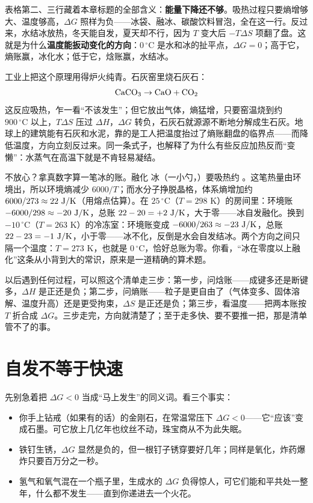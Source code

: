 表格第二、三行藏着本章标题的全部含义：\textbf{能量下降还不够}。吸热过程只要熵增够大、温度够高，$\Delta G$ 照样为负——冰袋、融冰、碳酸饮料冒泡，全在这一行。反过来，水结冰放热，冬天能自发，夏天却不行，因为 $T$ 变大后 $-T\Delta S$ 项翻了盘。这就是为什么\textbf{温度能扳动变化的方向}：$0\,^{\circ}\mathrm{C}$ 是水和冰的扯平点，$\Delta G=0$；高于它，熵账赢，冰化水；低于它，焓账赢，水结冰。

工业上把这个原理用得炉火纯青。石灰窑里烧石灰石：\[\mathrm{CaCO_3} \rightarrow \mathrm{CaO} + \mathrm{CO_2}\] 这反应吸热，乍一看“不该发生”；但它放出气体，熵猛增，只要窑温烧到约 $900\,^{\circ}\mathrm{C}$ 以上，$T\Delta S$ 压过 $\Delta H$，$\Delta G$ 转负，石灰石就源源不断地分解成生石灰。地球上的建筑能有石灰和水泥，靠的是工人把温度抬过了熵账翻盘的临界点——而降低温度，方向立刻反过来。同一条式子，也解释了为什么有些反应加热反而“变懒”：水蒸气在高温下就是不肯轻易凝结。

不放心？拿真数字算一笔冰的账。融化  冰（一小勺，）要吸热约 。这笔热量由环境出，所以环境熵减少 $6000/T$；而水分子挣脱晶格，体系熵增加约 $6000/273\approx22\ \mathrm{J/K}$（用熔点估算）。在 $25\,^{\circ}\mathrm{C}$（$T=298$ K）的房间里：环境账 $-6000/298\approx-20\ \mathrm{J/K}$，总账 $22-20=+2\ \mathrm{J/K}$，大于零——冰自发融化。换到 $-10\,^{\circ}\mathrm{C}$（$T=263$ K）的冷冻室：环境账变成 $-6000/263\approx-23\ \mathrm{J/K}$，总账 $22-23=-1\ \mathrm{J/K}$，小于零——冰不化，反倒是水会自发结冰。两个方向之间只隔一个温度：$T=273$ K，也就是 $0\,^{\circ}\mathrm{C}$，恰好总账为零。你看，“冰在零度以上融化”这条从小背到大的常识，原来是一道精确的算术题。

以后遇到任何过程，可以照这个清单走三步：第一步，问焓账——成键多还是断键多，$\Delta H$ 是正还是负；第二步，问熵账——粒子是更自由了（气体变多、固体溶解、温度升高）还是更受拘束，$\Delta S$ 是正还是负；第三步，看温度——把两本账按 $T$ 折合成 $\Delta G$。三步走完，方向就清楚了；至于走多快、要不要推一把，那是清单管不了的事。

\section{自发不等于快速}

先别急着把 $\Delta G<0$ 当成“马上发生”的同义词。看三个事实：

\begin{itemize}[itemsep=2pt]
\item 你手上钻戒（如果有的话）的金刚石，在常温常压下 $\Delta G<0$——它“应该”变成石墨。可它放上几亿年也纹丝不动，珠宝商从不为此失眠。
\item 铁钉生锈，$\Delta G$ 显然是负的，但一根钉子锈穿要好几年；同样是氧化，炸药爆炸只要百万分之一秒。
\item 氢气和氧气混在一个瓶子里，生成水的 $\Delta G$ 负得惊人，可它们能和平共处一整年，什么都不发生——直到你递进去一个火花。
\end{itemize}

